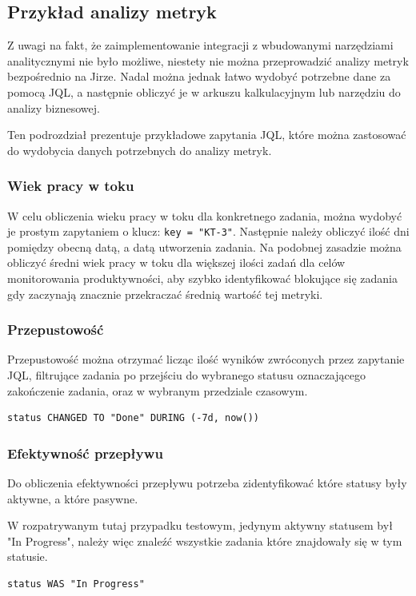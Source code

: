 \subsection{Przykład analizy metryk}
Z uwagi na fakt, że zaimplementowanie integracji z wbudowanymi narzędziami analitycznymi nie było możliwe, niestety nie można przeprowadzić analizy metryk bezpośrednio na Jirze. Nadal można jednak łatwo wydobyć potrzebne
dane za pomocą JQL, a następnie obliczyć je w arkuszu kalkulacyjnym lub narzędziu do analizy biznesowej.

Ten podrozdział prezentuje przykładowe zapytania JQL, które można zastosować do wydobycia danych potrzebnych do analizy metryk.

\subsubsection*{Wiek pracy w toku}
W celu obliczenia wieku pracy w toku dla konkretnego zadania, można wydobyć je prostym zapytaniem o klucz: \lstinline{key = "KT-3"}.
Następnie należy obliczyć ilość dni pomiędzy obecną datą, a datą utworzenia zadania.
Na podobnej zasadzie można obliczyć średni wiek pracy w toku dla większej ilości zadań dla celów monitorowania produktywności, aby szybko identyfikować blokujące się zadania gdy zaczynają znacznie przekraczać średnią wartość tej metryki.

\subsubsection*{Przepustowość}
Przepustowość można otrzymać licząc ilość wyników zwróconych przez zapytanie JQL, filtrujące zadania po przejściu do wybranego statusu oznaczającego zakończenie zadania, oraz w wybranym przedziale czasowym.
\begin{lstlisting}[caption=Zapytanie JQL pozwalające obliczyć przepustowość w przeciągu ostatniego tygodnia]
status CHANGED TO "Done" DURING (-7d, now())
\end{lstlisting}

\subsubsection*{Efektywność przepływu}
Do obliczenia efektywności przepływu potrzeba zidentyfikować które statusy były aktywne, a które pasywne.

W rozpatrywanym tutaj przypadku testowym, jedynym aktywny statusem był "In Progress", należy więc znaleźć wszystkie zadania które znajdowały się w tym statusie.
\begin{lstlisting}[caption=Zapytanie JQL pozwalające obliczyć efektywność przepływu]
status WAS "In Progress"
\end{lstlisting}

